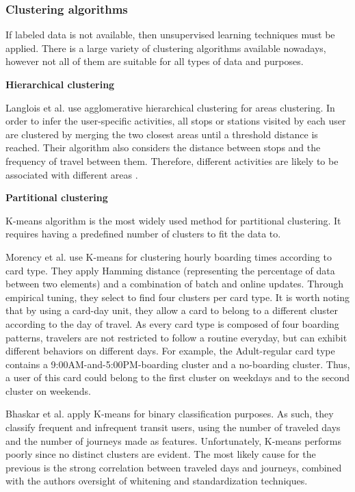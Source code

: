 \documentclass{article}
\begin{document}
\subsubsection{Clustering algorithms} 
If labeled data is not available, then unsupervised learning techniques must be applied. There is a large variety of clustering algorithms available nowadays, however not all of them are suitable for all types of data and purposes.

\textbf{Hierarchical clustering}

Langlois et al. use agglomerative hierarchical clustering for areas clustering. In order to infer the user-specific activities, all stops or stations visited by each user are clustered by merging the two closest areas until a threshold distance is reached. Their algorithm also considers the distance between stops and the frequency of travel between them. Therefore, different activities are likely to be associated with different areas \cite{langlois2016inferring}.

\textbf{Partitional clustering}

K-means algorithm is the most widely used method for partitional clustering. It requires having a predefined number of clusters to fit the data to. 

Morency et al. use K-means for clustering hourly boarding times according to card type. They apply Hamming distance (representing the percentage of data between two elements) and a combination of batch and online updates. Through empirical tuning, they select to find four clusters per card type. It is worth noting that by using a card-day unit, they allow a card to belong to a different cluster according to the day of travel. As every card type is composed of four boarding patterns, travelers are not restricted to follow a routine everyday, but can exhibit different behaviors on different days. For example, the Adult-regular card type contains a 9:00AM-and-5:00PM-boarding cluster and a no-boarding cluster. Thus, a user of this card could belong to the first cluster on weekdays and to the second cluster on weekends.  \cite{morency2007measuring}

Bhaskar et al. apply K-means for binary classification purposes. As such, they classify frequent and infrequent transit users, using the number of traveled days and the number of journeys made as features. Unfortunately, K-means performs poorly since no distinct clusters are evident. The most likely cause for the previous is the strong correlation between traveled days and journeys, combined with the authors oversight of whitening and standardization techniques. \cite{bhaskar2015passenger}
\end{document}
